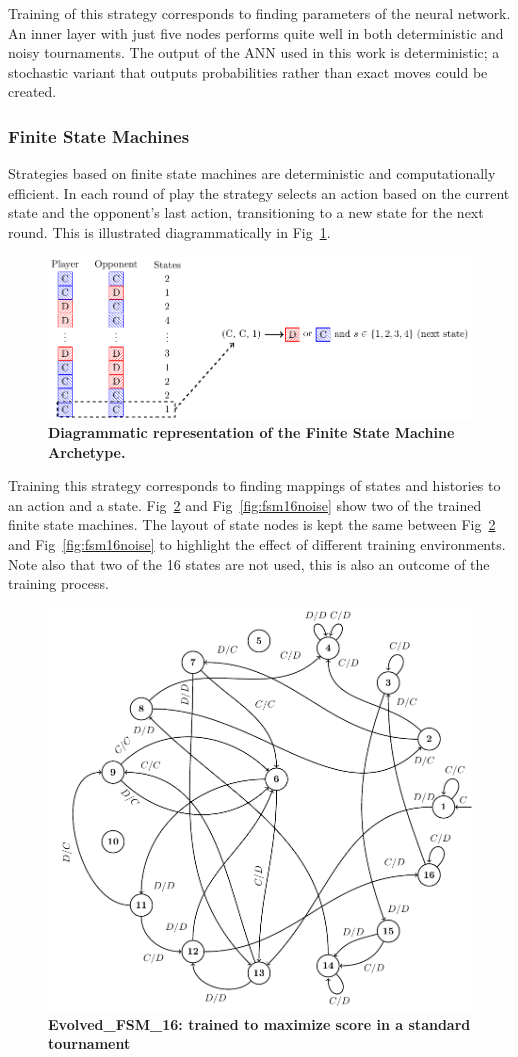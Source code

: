 \documentclass[10pt,letterpaper]{article}
\begin{document}
Training of this strategy corresponds to finding parameters of the neural
network. An inner layer with just five nodes performs quite well in both deterministic and
noisy tournaments. The output of the ANN used in this work is deterministic;
a stochastic variant that outputs probabilities rather than exact moves could
be created.

\subsubsection*{Finite State Machines}\label{sec:fsm}

Strategies based on finite state machines are deterministic and computationally efficient.
In each round of play the strategy selects an action based on the current state
and the opponent's last action, transitioning to a new state for the next round.
This is illustrated diagrammatically in Fig~\ref{fig:fsm}.

\begin{figure}[!hbtp]
    \centering
    \includegraphics[width=\textwidth]{fsm.pdf}
    \caption{\bf Diagrammatic representation of the Finite State Machine Archetype.}
    \label{fig:fsm}
\end{figure}

Training this strategy corresponds to finding mappings of states and histories
to an action and a state. Fig~\ref{fig:fsm16} and Fig~\ref{fig:fsm16noise} show
two of the trained
finite state machines. The layout of state nodes is kept the same between
Fig~\ref{fig:fsm16} and Fig~\ref{fig:fsm16noise} to highlight the effect of
different training environments. Note also that two of the 16 states are not
used, this is also an outcome of the training process.


\begin{figure}[!hbtp]
    \centering
        \includegraphics[width=.5\textwidth]{FSM16.pdf}
        \caption{\bf Evolved\_FSM\_16: trained to maximize score in a standard
        tournament}
        \label{fig:fsm16}
\end{figure}
\end{document}
